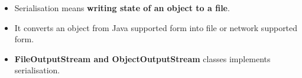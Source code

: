 \setlength{\columnsep}{3pt}
\begin{flushleft}
	\begin{itemize}
		\item Serialisation means \textbf{writing state of an object to a file}.
		\item It converts an object from Java supported form into file or network supported form.
		\item \textbf{FileOutputStream and ObjectOutputStream} classes implements serialisation.
		
	\end{itemize}
\end{flushleft}
\newpage